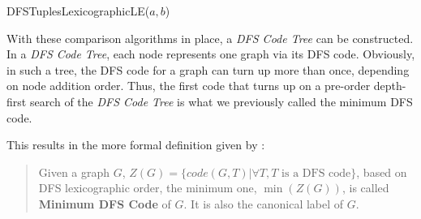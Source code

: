 \documentclass[pdftex,12pt,a4paper]{report}
\begin{document}
\begin{algorithm}
	\caption{DFSTuplesLexicographicLE($a, b$)}\label{alg:dfs_lexicographic_order_tuples}
	\begin{algorithmic}[1]
			\State{}
		\EndIf
			\State{}
		\EndIf
			\State{}
		\EndIf
			\State{}
		\EndIf
				\State{}
			\EndIf
				\State{}
			\EndIf
		\EndIf
				\State{}
			\EndIf
				\State{}
			\EndIf
		\EndIf
		\State{}
		
	\end{algorithmic}
\end{algorithm}

With these comparison algorithms in place, a \textit{DFS Code Tree} can be constructed. In a \textit{DFS Code Tree}, each node represents one graph via its DFS code. Obviously, in such a tree, the DFS code for a graph can turn up more than once, depending on node addition order. Thus, the first code that turns up on a pre-order depth-first search of the \textit{DFS Code Tree} is what we previously called the minimum DFS code.

This results in the more formal definition given by \cite{Yan2002-hg}:
\begin{quotation}
	Given a graph $G$, $Z(G) = \{code(G, T) | \forall T, T \text{ is a DFS code}\}$, based on DFS lexicographic order, the minimum one, $\min(Z(G))$, is called \textbf{Minimum DFS Code} of $G$. It is also the canonical label of $G$.
\end{quotation}
\end{document}
